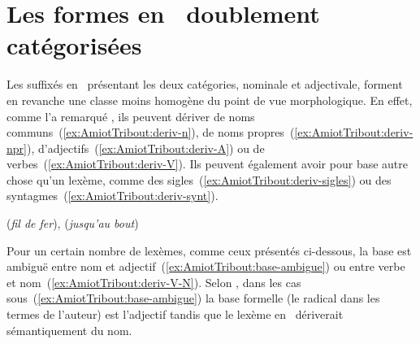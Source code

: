 \documentclass[output=paper]{LSP/langsci}
\begin{document}
\section{Les formes en \iste\ doublement catégorisées} \label{section:AmiotTribout:iste-AN}
Les suffixés en \iste\  présentant les deux catégories, nominale et adjectivale, forment en revanche une classe moins homogène du point de vue morphologique. En effet, comme l'a remarqué \cite{roche11}, ils peuvent dériver de noms communs~(\ref{ex:AmiotTribout:deriv-n}), de noms propres~(\ref{ex:AmiotTribout:deriv-npr}), d'adjectifs~(\ref{ex:AmiotTribout:deriv-A}) ou de verbes~(\ref{ex:AmiotTribout:deriv-V}). Ils peuvent également avoir pour base autre chose qu'un lexème, comme des sigles~(\ref{ex:AmiotTribout:deriv-sigles}) ou des syntagmes~(\ref{ex:AmiotTribout:deriv-synt}).

\begin{exe}
\ex
\begin{xlist}
\ex {} \label{ex:AmiotTribout:deriv-n}
\ex \label{ex:AmiotTribout:deriv-npr} 
\ex \label{ex:AmiotTribout:deriv-A} 
\ex \label{ex:AmiotTribout:deriv-V} 
\ex \label{ex:AmiotTribout:deriv-sigles} 
\ex \label{ex:AmiotTribout:deriv-synt}  (\orientg \textit{fil de fer}),  (\orientg \textit{jusqu'au bout})
\end{xlist}
\end{exe}

Pour un certain nombre de lexèmes, comme ceux présentés ci-dessous, la base est ambiguë entre nom et adjectif~(\ref{ex:AmiotTribout:base-ambigue}) ou entre verbe et nom~(\ref{ex:AmiotTribout:deriv-V-N}). Selon \cite{roche11}, dans les cas sous~(\ref{ex:AmiotTribout:base-ambigue}) la base formelle (le radical dans les termes de l'auteur) est l'adjectif tandis que le lexème en \iste\ dériverait sémantiquement du nom.
\end{document}
